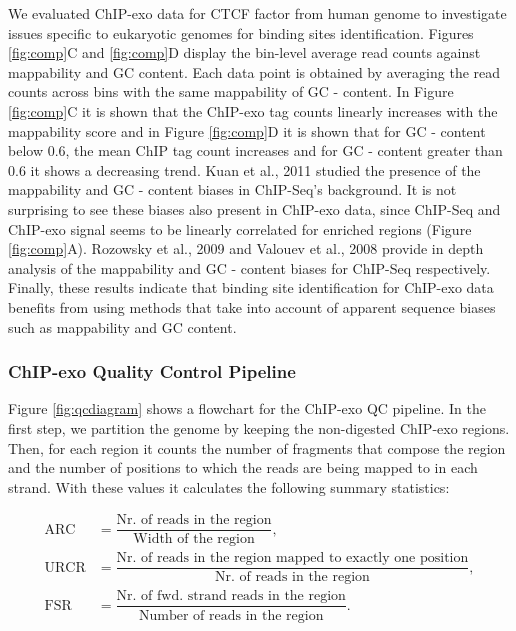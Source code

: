 \documentclass{bmcart}\usepackage[]{graphicx}\usepackage[]{color}
\begin{document}
We evaluated ChIP-exo data for CTCF factor from human genome
\cite{exo1} to investigate issues specific to eukaryotic genomes for
binding sites identification. Figures \ref{fig:comp}C and
\ref{fig:comp}D display the bin-level average read counts against
mappability and GC content. Each data point is obtained by averaging
the read counts across bins with the same mappability of GC -
content. In Figure \ref{fig:comp}C it is shown that the ChIP-exo tag
counts linearly increases with the mappability score and in Figure
\ref{fig:comp}D it is shown that for GC - content below 0.6, the mean
ChIP tag count increases and for GC - content greater than 0.6 it
shows a decreasing trend. Kuan et al., 2011 \cite{mosaics} studied the
presence of the mappability and GC - content biases in ChIP-Seq's
background. It is not surprising to see these biases also present in
ChIP-exo data, since ChIP-Seq and ChIP-exo signal seems to be linearly
correlated for enriched regions (Figure \ref{fig:comp}A). Rozowsky et
al., 2009 \cite{peakseq} and Valouev et al., 2008 \cite{quest} provide
in depth analysis of the mappability and GC - content biases for
ChIP-Seq respectively. Finally, these results indicate that binding
site identification for ChIP-exo data benefits from using methods that
take into account of apparent sequence biases such as mappability and
GC content.

\subsubsection{ChIP-exo Quality Control Pipeline}

Figure \ref{fig:qcdiagram} shows a flowchart for the ChIP-exo QC
pipeline. In the first step, we partition the genome by keeping the
non-digested ChIP-exo regions. Then, for each region it counts the
number of fragments that compose the region and the number of
positions to which the reads are being mapped to in each strand. With
these values it calculates the following summary statistics:

\begin{align*}
  \text{ARC} &= \dfrac{\text{Nr. of reads in the region}}{\text{Width of the region}}, \\
  \text{URCR} &= \dfrac{\text{Nr. of reads in the region mapped to
      exactly one position}}{\text{Nr. of reads in the region}}, \\
  \text{FSR} &= \dfrac{\text{Nr. of fwd. strand reads in the
      region}}{\text{Number of reads in the region}}.
\end{align*}
\end{document}
